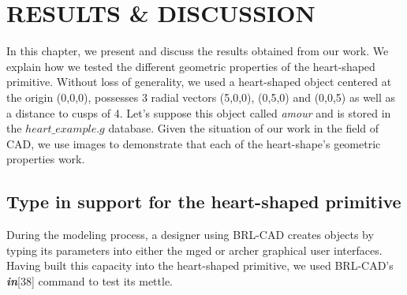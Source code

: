 
\chapter{RESULTS \& DISCUSSION} %

\label{Results \& Discussion} %



\hspace{30} In   this   chapter,   we   present   and   discuss   the   results   obtained   from   our  
work.   We   explain   how   we   tested   the   different   geometric   properties   of   the  
heart­-shaped   primitive.   Without   loss   of   generality,   we   used   a   heart-­shaped  
object   centered   at   the   origin   (0,0,0), possesses   3   radial   vectors (5,0,0), (0,5,0) 
and (0,0,5) as   well   as   a   distance   to   cusps   of   4.   Let's   suppose   this  
object   called   \emph{amour}   and   is   stored   in   the   $heart\_example.g$   database. 
Given the situation of our work in the field of CAD, we   use   images   to   demonstrate   that 
  each   of   the   heart­-shape's   geometric  properties work.  


\section{Type in support for the heart­-shaped primitive}

\hspace{30} During   the   modeling   process,   a   designer   using   BRL­-CAD   creates objects   by   typing   
its   parameters   into   either   the   mged   or   archer   graphical   user  interfaces.   
Having   built   this   capacity   into   the   heart-­shaped   primitive,   we   used  
BRL-­CAD's \textbf{\textit{in}}[38] command to test its mettle.  

